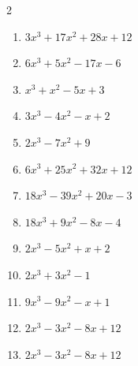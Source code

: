\begin{multicols}{2}
\begin{enumerate}
  \item $3x^{3}+17x^{2}+28x+12$

        \phantom{$=(3x+2)(x+2)(x+3)$}

  \item $6x^{3}+5x^{2}-17x-6$

        \phantom{$=(2x-3)(3x+1)(x+2)$}

  \item $x^{3}+x^{2}-5x+3$


\columnbreak %

  \item $3x^{3}-4x^{2}-x+2$


  \item $2x^{3}-7x^{2}+9$

        \phantom{$=(2x-3)(x+1)(x-3)$}

  \item $6x^{3}+25x^{2}+32x+12$

        \phantom{$=(2x+3)(3x+2)(x+2)$}

  \item $18x^{3}-39x^{2}+20x-3$


  \item $18x^{3}+9x^{2}-8x-4$

        \phantom{$=(2x+1)(3x+2)(3x-2)$}

\columnbreak %

\resetques

  \item $2x^{3}-5x^{2}+x+2$

        \phantom{$=(2x+1)(x-1)(x-2)$}

  \item $2x^{3}+3x^{2}-1$


  \item $9x^{3}-9x^{2}-x+1$

        \phantom{$=(3x+1)(3x-1)(x-1)$}

  \item $2x^{3}-3x^{2}-8x+12$

        \phantom{$=(2x-3)(x+2)(x-2)$}

  \item $2x^{3}-3x^{2}-8x+12$

        \phantom{$=(2x-3)(x+2)(x-2)$}


\end{enumerate}
\end{multicols}
